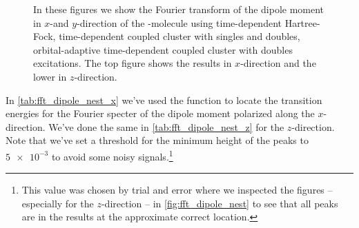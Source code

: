 \begin{figure}
            \caption{In these figures we show the Fourier transform of the
            dipole moment in $x$-and $y$-direction of the -molecule
            using time-dependent Hartree-Fock, time-dependent coupled cluster
            with singles and doubles, orbital-adaptive time-dependent coupled
            cluster with doubles excitations.
            The top figure shows the results in $x$-direction and the lower
            in $z$-direction.}
            \label{fig:fft_dipole_nest}
        \end{figure}
        In \autoref{tab:fft_dipole_nest_x} we've used the function
         \cite{scipy} to locate the transition
        energies for the Fourier specter of the dipole moment polarized along
        the $x$-direction.
        We've done the same in \autoref{tab:fft_dipole_nest_z} for the
        $z$-direction.
        Note that we've set a threshold for the minimum height of the peaks to
        $\num{5e-3}$ to avoid some noisy signals.\footnote{%
            This value was chosen by trial and error where we inspected the
            figures --especially for the $z$-direction -- in
            \autoref{fig:fft_dipole_nest} to see that all peaks are in the
            results at the approximate correct location.
        }

